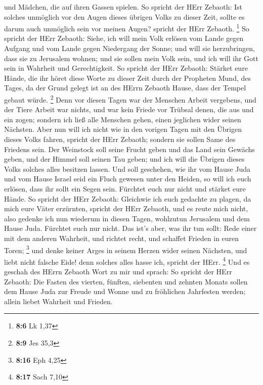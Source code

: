 und Mädchen, die auf ihren Gassen spielen.  So spricht der
HErr Zebaoth: Ist solches unmöglich vor den Augen dieses übrigen Volks
zu dieser Zeit, sollte es darum auch unmöglich sein vor meinen Augen?
spricht der HErr Zebaoth. \footnote{\textbf{8:6} Lk 1,37} 
So spricht der HErr Zebaoth: Siehe, ich will mein Volk erlösen vom Lande
gegen Aufgang und vom Lande gegen Niedergang der Sonne;  und
will sie herzubringen, dass sie zu Jerusalem wohnen; und sie sollen mein
Volk sein, und ich will ihr Gott sein in Wahrheit und Gerechtigkeit.
 So spricht der HErr Zebaoth: Stärket eure Hände, die ihr
höret diese Worte zu dieser Zeit durch der Propheten Mund, des Tages, da
der Grund gelegt ist an des HErrn Zebaoth Hause, dass der Tempel gebaut
würde. \footnote{\textbf{8:9} Jes 35,3}  Denn vor diesen
Tagen war der Menschen Arbeit vergebens, und der Tiere Arbeit war
nichts, und war kein Friede vor Trübsal denen, die aus und ein zogen;
sondern ich ließ alle Menschen gehen, einen jeglichen wider seinen
Nächsten.  Aber nun will ich nicht wie in den vorigen Tagen
mit den Übrigen dieses Volks fahren, spricht der HErr Zebaoth;
 sondern sie sollen Same des Friedens sein. Der Weinstock
soll seine Frucht geben und das Land sein Gewächs geben, und der Himmel
soll seinen Tau geben; und ich will die Übrigen dieses Volks solches
alles besitzen lassen.  Und soll geschehen, wie ihr vom
Hause Juda und vom Hause Israel seid ein Fluch gewesen unter den Heiden,
so will ich euch erlösen, dass ihr sollt ein Segen sein. Fürchtet euch
nur nicht und stärket eure Hände.  So spricht der HErr
Zebaoth: Gleichwie ich euch gedachte zu plagen, da mich eure Väter
erzürnten, spricht der HErr Zebaoth, und es reute mich nicht,
 also gedenke ich nun wiederum in diesen Tagen, wohlzutun
Jerusalem und dem Hause Juda. Fürchtet euch nur nicht.  Das
ist's aber, was ihr tun sollt: Rede einer mit dem anderen Wahrheit, und
richtet recht, und schaffet Frieden in euren Toren; \footnote{\textbf{8:16}
  Eph 4,25}  und denke keiner Arges in seinem Herzen wider
seinen Nächsten, und liebt nicht falsche Eide! denn solches alles hasse
ich, spricht der HErr. \footnote{\textbf{8:17} Sach 7,10} 
Und es geschah des HErrn Zebaoth Wort zu mir und sprach: 
So spricht der HErr Zebaoth: Die Fasten des vierten, fünften, siebenten
und zehnten Monats sollen dem Hause Juda zur Freude und Wonne und zu
fröhlichen Jahrfesten werden; allein liebet Wahrheit und Frieden.
